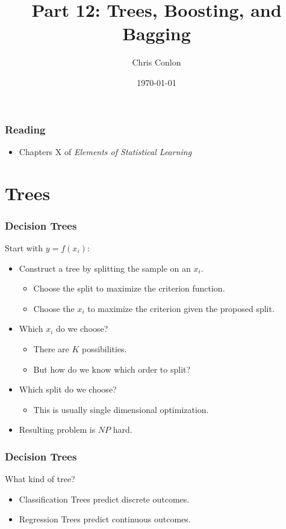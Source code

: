 \documentclass[xcolor=pdftex,dvipsnames,table,mathserif,aspectratio=169]{beamer}
\begin{document}
\title{Part 12: Trees, Boosting, and Bagging}
\author{Chris Conlon}
\date{\today}

\frame{\titlepage}


\begin{frame}
\frametitle{Reading}
\begin{itemize}
\item Chapters X of \textit{Elements of Statistical Learning}
\end{itemize}
\end{frame}



\section{Trees}
\begin{frame}
\frametitle{Decision Trees}
Start with $y = f(x_i)$:
\begin{itemize}
\item Construct a \alert{tree} by \alert{splitting} the sample on an $x_i$.
\begin{itemize}
\item Choose the split to maximize the criterion function.
\item Choose the $x_i$ to maximize the criterion given the proposed split.
\end{itemize}
\item Which $x_i$ do we choose?
\begin{itemize}
\item There are $K$ possibilities. 
\item But how do we know which order to split?
\end{itemize}
\item Which split do we choose?
\begin{itemize}
\item This is usually single dimensional optimization.
\end{itemize}
\item Resulting problem is $NP$ hard.
\end{itemize}
\end{frame}

\begin{frame}
\frametitle{Decision Trees}
What kind of tree?
\begin{itemize}
\item \alert{Classification} Trees predict \alert{discrete} outcomes.
\item \alert{Regression} Trees predict \alert{continuous} outcomes.
\end{itemize}
\end{frame}
\end{document}

